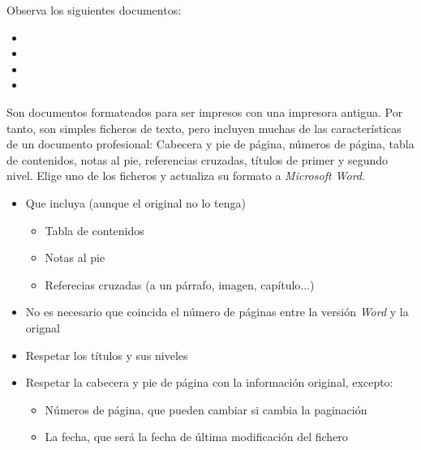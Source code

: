 \begin{homeworkProblem}
  Observa los siguientes documentos:
  \begin{itemize}
  \item {}
  \item {}
  \item {}
  \item {}      
  \end{itemize}

  Son documentos formateados para ser impresos con una impresora antigua. Por tanto, son simples ficheros de texto, pero incluyen muchas de las características de un documento profesional: Cabecera y pie de página,  números de página,  tabla de contenidos,  notas al pie,  referencias cruzadas,  títulos de primer y segundo nivel. Elige uno de los ficheros y actualiza su formato a \textit{Microsoft Word}.

  \begin{Aviso}

    \begin{itemize}
    \item Que incluya (aunque el original no lo tenga)
      \begin{itemize}
      \item Tabla de contenidos
      \item Notas al pie
      \item Referecias cruzadas (a un párrafo, imagen, capítulo...)
      \end{itemize}
    \item No es necesario que coincida el número de páginas entre la versión \textit{Word} y la orignal    
    \item Respetar los títulos y sus niveles
    \item Respetar la cabecera y pie de página con la información original, excepto:
      \begin{itemize}
      \item Números de página, que pueden cambiar si cambia la paginación
      \item La fecha, que será la fecha de última modificación del fichero
      \end{itemize}
    \end{itemize}
  \end{Aviso}
\end{homeworkProblem}

